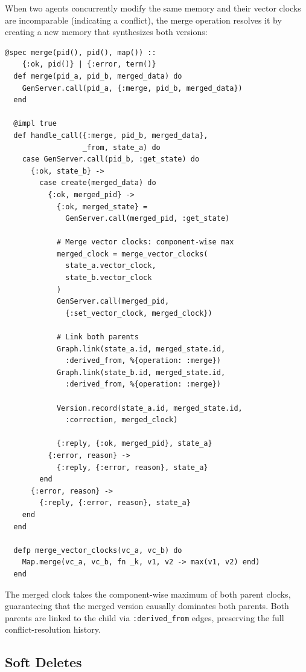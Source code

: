 \documentclass[12pt,a4paper]{article}
\theoremstyle{definition}
\begin{document}
When two agents concurrently modify the same memory and their vector clocks are incomparable (indicating a conflict), the merge operation resolves it by creating a new memory that synthesizes both versions:

\begin{lstlisting}[caption={Merging concurrent versions with vector clock unification.}, label={lst:merge}]
  @spec merge(pid(), pid(), map()) ::
    {:ok, pid()} | {:error, term()}
  def merge(pid_a, pid_b, merged_data) do
    GenServer.call(pid_a, {:merge, pid_b, merged_data})
  end

  @impl true
  def handle_call({:merge, pid_b, merged_data},
                  _from, state_a) do
    case GenServer.call(pid_b, :get_state) do
      {:ok, state_b} ->
        case create(merged_data) do
          {:ok, merged_pid} ->
            {:ok, merged_state} =
              GenServer.call(merged_pid, :get_state)

            # Merge vector clocks: component-wise max
            merged_clock = merge_vector_clocks(
              state_a.vector_clock,
              state_b.vector_clock
            )
            GenServer.call(merged_pid,
              {:set_vector_clock, merged_clock})

            # Link both parents
            Graph.link(state_a.id, merged_state.id,
              :derived_from, %{operation: :merge})
            Graph.link(state_b.id, merged_state.id,
              :derived_from, %{operation: :merge})

            Version.record(state_a.id, merged_state.id,
              :correction, merged_clock)

            {:reply, {:ok, merged_pid}, state_a}
          {:error, reason} ->
            {:reply, {:error, reason}, state_a}
        end
      {:error, reason} ->
        {:reply, {:error, reason}, state_a}
    end
  end

  defp merge_vector_clocks(vc_a, vc_b) do
    Map.merge(vc_a, vc_b, fn _k, v1, v2 -> max(v1, v2) end)
  end
\end{lstlisting}

The merged clock takes the component-wise maximum of both parent clocks, guaranteeing that the merged version causally dominates both parents.
Both parents are linked to the child via \texttt{:derived\_from} edges, preserving the full conflict-resolution history.

\subsection{Soft Deletes}\label{subsec:soft-delete}
\end{document}
